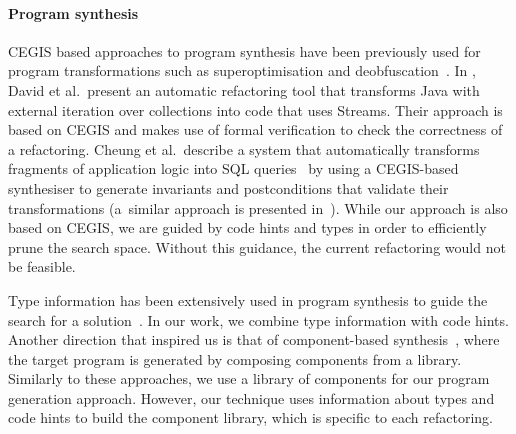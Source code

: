 \documentclass[10pt,conference]{IEEEtran}
\begin{document}
\paragraph{Program synthesis}


CEGIS based approaches to program synthesis have been previously used
for program transformations such as superoptimisation and
deobfuscation~\cite{DBLP:conf/icse/JhaGST10}.  In
\cite{DBLP:journals/corr/abs-1712-07388}, David et al.~present an
automatic refactoring tool that transforms Java with external
iteration over collections into code that uses Streams. Their approach
is based on CEGIS and makes use of formal verification to check the
correctness of a refactoring.  Cheung et al.~describe a system that
automatically transforms fragments of application logic into SQL
queries~\cite{DBLP:conf/pldi/CheungSM13} by using a CEGIS-based
synthesiser to generate invariants and postconditions that validate
their transformations (a~similar approach is presented
in~\cite{DBLP:conf/cc/IuCZ10}).  While our approach is also based
on CEGIS, we are guided by code hints and types in
order to efficiently prune the search space. Without this guidance,
the current refactoring would not be feasible.  

Type information has been extensively used in program synthesis to
guide the search for a solution~\cite{DBLP:conf/sfp/Katayama05,DBLP:conf/pldi/FeserCD15,DBLP:conf/pldi/OseraZ15,DBLP:journals/pacmpl/LubinCOC20,DBLP:journals/pacmpl/YamaguchiMDW21}.
In our work, we combine type information with code hints.
%
Another direction that inspired us is that of component-based synthesis~\cite{DBLP:conf/icse/JhaGST10,DBLP:conf/pldi/GulwaniJTV11,DBLP:conf/popl/FengM0DR17}, where the target program is generated by composing components from a library. Similarly
to these approaches, we use a library of components for our program
generation approach. However, our technique uses information about types
and code hints to build the component library, which is specific to each refactoring.



\end{document}
